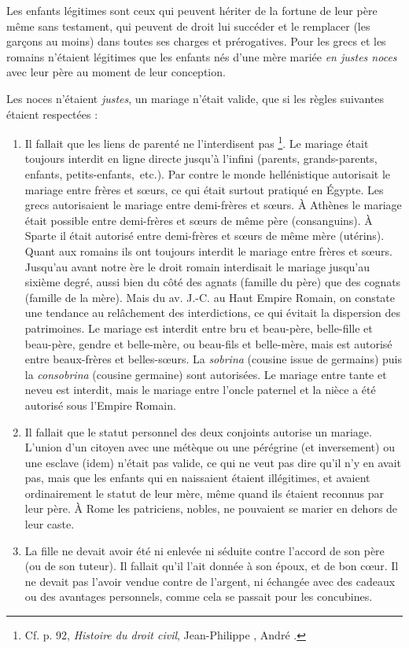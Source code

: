 Les enfants légitimes sont ceux qui peuvent hériter de la fortune
de leur père même sans testament, qui peuvent de droit lui succéder et le
remplacer (les garçons au moins) dans toutes ses charges et prérogatives.
Pour les grecs et les romains n'étaient légitimes que les enfants nés d'une
mère mariée \emph{en justes noces} avec leur père au moment de leur conception.

Les noces n'étaient \emph{justes}, un mariage n'était valide, que si les règles
suivantes étaient respectées :
\begin{enumerate}
\item Il fallait que les liens de parenté ne l'interdisent pas%
\footnote{Cf. p. 92, \emph{Histoire du droit civil}, Jean-Philippe , André .}.
Le mariage
était toujours interdit en ligne directe jusqu'à l'infini (parents,
grands-parents, enfants, petits-enfants,~etc.). Par contre le monde hellénistique
autorisait le mariage entre frères et sœurs, ce qui était surtout
pratiqué en Égypte. Les grecs autorisaient le mariage entre demi-frères et
sœurs. À Athènes le mariage était possible entre demi-frères et sœurs de
même père (consanguins). À Sparte il était autorisé entre demi-frères et
sœurs de même mère (utérins). Quant aux romains ils ont toujours interdit
le mariage entre frères et sœurs. Jusqu'au  avant notre
ère le droit romain interdisait le mariage jusqu'au sixième degré, aussi
bien du côté des agnats (famille du père) que des cognats (famille de la
mère). Mais du  av. J.-C. au Haut Empire Romain, on constate
une tendance au relâchement des interdictions, ce qui évitait la
dispersion des patrimoines. Le mariage est interdit entre bru et beau-père,
belle-fille et beau-père, gendre et belle-mère, ou beau-fils et belle-mère,
mais est autorisé entre beaux-frères et belles-sœurs. La \emph{sobrina}
(cousine issue de germains) puis la \emph{consobrina} (cousine germaine) sont
autorisées. Le mariage entre tante et neveu est interdit, mais le mariage
entre l'oncle paternel et la nièce a été autorisé sous l'Empire Romain.
\item Il fallait que le statut personnel des deux conjoints autorise un
mariage. L'union d'un citoyen avec une métèque ou une pérégrine (et inversement)
ou une esclave (idem) n'était pas valide, ce qui ne veut pas dire
qu'il n'y en avait pas, mais que les enfants qui en naissaient étaient illégitimes,
et avaient ordinairement le statut de leur mère, même quand ils
étaient reconnus par leur père. À Rome les patriciens, nobles, ne pouvaient
se marier en dehors de leur caste.
\item La fille ne devait avoir été ni enlevée ni séduite contre l'accord
de son père (ou de son tuteur). Il fallait qu'il l'ait donnée à son époux, et
de bon cœur. Il ne devait pas l'avoir vendue contre de l'argent, ni échangée
avec des cadeaux ou des avantages personnels, comme cela se passait
pour les concubines.
\end{enumerate}
